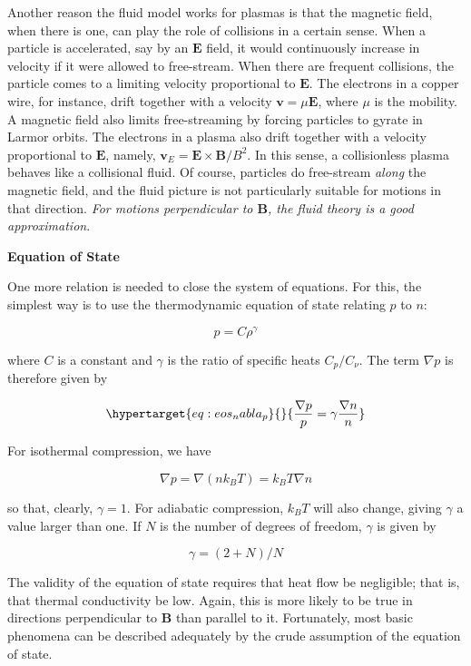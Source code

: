 \documentclass[
  notoc %
]{tufte-book}
\begin{document}
Another reason the fluid model works for plasmas is that the magnetic
field, when there is one, can play the role of collisions in a certain
sense. When a particle is accelerated, say by an \(\mathbf{E}\) field,
it would continuously increase in velocity if it were allowed to
free-stream. When there are frequent collisions, the particle comes to a
limiting velocity proportional to \(\mathbf{E}\). The electrons in a
copper wire, for instance, drift together with a velocity
\(\mathbf{v}=\mu\mathbf{E}\), where \(\mu\) is the mobility. A magnetic
field also limits free-streaming by forcing particles to gyrate in
Larmor orbits. The electrons in a plasma also drift together with a
velocity proportional to \(\mathbf{E}\), namely,
\(\mathbf{v}_E=\mathbf{E}\times\mathbf{B}/B^2\). In this sense, a
collisionless plasma behaves like a collisional fluid. Of course,
particles do free-stream \emph{along} the magnetic field, and the fluid
picture is not particularly suitable for motions in that direction.
\emph{For motions perpendicular to \(\mathbf{B}\), the fluid theory is a
good approximation}.

\textbf{Equation of State}

One more relation is needed to close the system of equations. For this,
the simplest way is to use the thermodynamic equation of state relating
\(p\) to \(n\):

\[
p = C\rho^\gamma
\]

where \(C\) is a constant and \(\gamma\) is the ratio of specific heats
\(C_p/C_\nu\). The term \(\nabla p\) is therefore given by

\begin{equation}\protect\hypertarget{eq:eos_nabla_p}{}{
\frac{\nabla p}{p} = \gamma \frac{\nabla n}{n}
}\label{eq:eos_nabla_p}\end{equation}

For isothermal compression, we have

\[
\nabla p = \nabla(nk_B T) = k_B T\nabla n
\]

so that, clearly, \(\gamma=1\). For adiabatic compression, \(k_B T\)
will also change, giving \(\gamma\) a value larger than one. If \(N\) is
the number of degrees of freedom, \(\gamma\) is given by

\[
\gamma = (2+N)/N
\]

The validity of the equation of state requires that heat flow be
negligible; that is, that thermal conductivity be low. Again, this is
more likely to be true in directions perpendicular to \(\mathbf{B}\)
than parallel to it. Fortunately, most basic phenomena can be described
adequately by the crude assumption of the equation of state.
\end{document}
